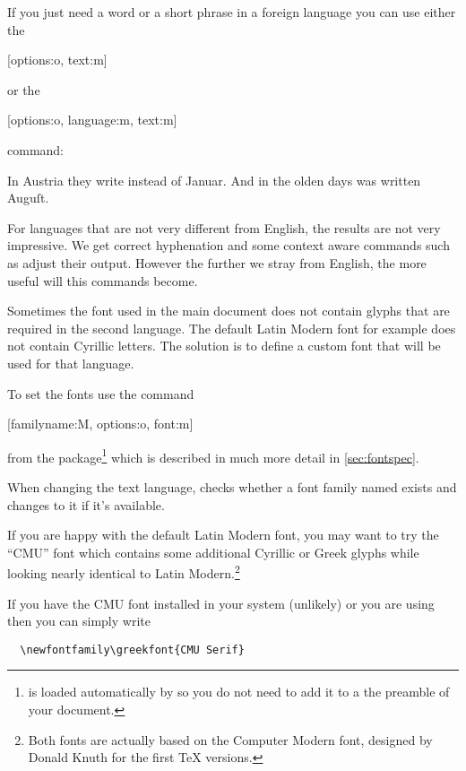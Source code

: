 If you just need a word or a short phrase in a foreign language you can use
either the
\begin{lscommand}
  [options:o, text:m]
\end{lscommand}
or the
\begin{lscommand}
  [options:o, language:m, text:m]
\end{lscommand}
command:
\begin{example}[examplewidth=0.8\linewidth, vertical_mode]
In Austria they write
instead of \textgerman{Januar}. And in the olden
days  was written
\textgerman[script=blackletter]{Auguſt}.
\end{example}

For languages that are not very different from English, the results are not
very impressive. We get correct hyphenation and some context aware commands
such as  adjust their output. However the further we stray from
English, the more useful will this commands become.

Sometimes the font used in the main document does not contain glyphs that are
required in the second language. The default Latin Modern font for example does
not contain Cyrillic letters. The solution is to define a custom font that will
be used for that language.

To set the fonts use the command
\begin{lscommand}
  [familyname:M, options:o, font:m]
\end{lscommand}
from the  package\footnote{ is loaded automatically
  by  so you do not need to add it to a the preamble of your
  document.} which is described in much more detail in
\autoref{sec:fontspec}.

When changing the text language,  checks whether a font family
named  exists and changes to it if it's available.

If you are happy with the default Latin Modern font, you may want to try the
\enquote{CMU} font which contains some additional Cyrillic or Greek glyphs
while looking nearly identical to Latin Modern.\footnote{Both fonts are
  actually based on the Computer Modern font, designed by Donald Knuth for the
  first \TeX{} versions.}

If you have the CMU font installed in your system (unlikely) or you are using
 then you can simply write
\begin{verbatim}
  \newfontfamily\greekfont{CMU Serif}
\end{verbatim}

